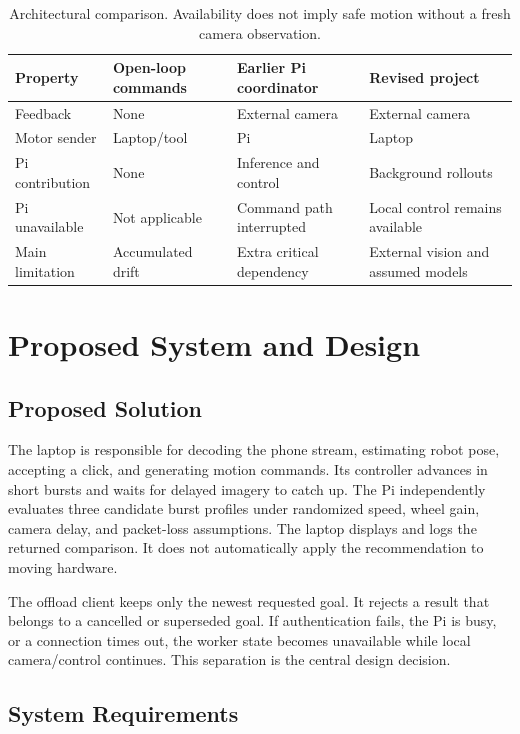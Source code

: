 \documentclass[11pt,a4paper]{article}
\begin{document}
\begin{table}[ht]\centering\small
\begin{tabularx}{\textwidth}{@{}lYYY@{}}\toprule
Property & Open-loop commands & Earlier Pi coordinator & Revised project\\\midrule
Feedback & None & External camera & External camera\\
Motor sender & Laptop/tool & Pi & Laptop\\
Pi contribution & None & Inference and control & Background rollouts\\
Pi unavailable & Not applicable & Command path interrupted & Local control remains available\\
Main limitation & Accumulated drift & Extra critical dependency & External vision and assumed models\\\bottomrule
\end{tabularx}
\caption{Architectural comparison. Availability does not imply safe motion without a fresh camera observation.}\label{tab:comparison}
\end{table}

\clearpage\section{Proposed System and Design}
\subsection{Proposed Solution}
The laptop is responsible for decoding the phone stream, estimating robot pose,
accepting a click, and generating motion commands. Its controller advances in short
bursts and waits for delayed imagery to catch up. The Pi independently evaluates
three candidate burst profiles under randomized speed, wheel gain, camera delay,
and packet-loss assumptions. The laptop displays and logs the returned comparison.
It does not automatically apply the recommendation to moving hardware.

The offload client keeps only the newest requested goal. It rejects a result that
belongs to a cancelled or superseded goal. If authentication fails, the Pi is busy,
or a connection times out, the worker state becomes unavailable while local
camera/control continues. This separation is the central design decision.

\subsection{System Requirements}
\end{document}
